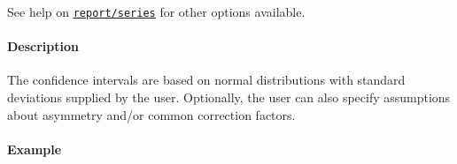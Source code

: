 See help on \href{report/series}{\texttt{report/series}} for other
options available.

\paragraph{Description}

The confidence intervals are based on normal distributions with standard
deviations supplied by the user. Optionally, the user can also specify
assumptions about asymmetry and/or common correction factors.

\paragraph{Example}


